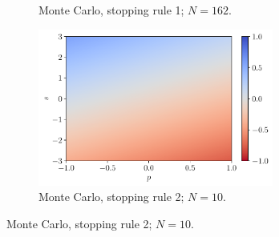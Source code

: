 \documentclass[a4paper, 12pt]{article}
\begin{document}
\begin{figure}[H]
\begin{subfigure}{0.49\textwidth}
            \caption{Monte Carlo, stopping rule 1; $N = 162$.}
        \end{subfigure}
        \hfill
        \begin{subfigure}{0.49\textwidth}
            \centering
            \includegraphics[width=0.85\textwidth]{resources/pdf/4_montecarlo_2_LR_q_-4.pdf}
            \caption{Monte Carlo, stopping rule 2; $N = 10$.}
        \end{subfigure}
        \label{fig:qn.lr.minus.4}
    \end{figure}
    
\end{document}
